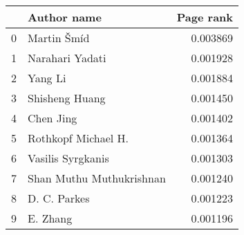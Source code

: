 \begin{tabular}{llr}
\toprule
{} &               Author name &  Page rank \\
\midrule
0 &               Martin Šmíd &   0.003869 \\
1 &           Narahari Yadati &   0.001928 \\
2 &                   Yang Li &   0.001884 \\
3 &            Shisheng Huang &   0.001450 \\
4 &                Chen  Jing &   0.001402 \\
5 &      Rothkopf  Michael H. &   0.001364 \\
6 &         Vasilis Syrgkanis &   0.001303 \\
7 &  Shan Muthu Muthukrishnan &   0.001240 \\
8 &              D. C. Parkes &   0.001223 \\
9 &                  E. Zhang &   0.001196 \\
\bottomrule
\end{tabular}
